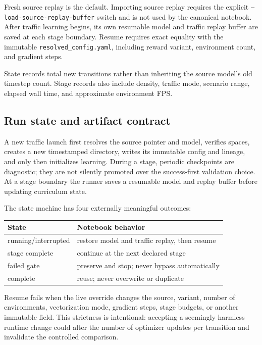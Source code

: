\documentclass[10pt,twocolumn]{article}
\begin{document}
Fresh source replay is the default. Importing source replay requires the explicit
\texttt{--load-source-replay-buffer} switch and is not used by the canonical notebook.
After traffic learning begins, its own resumable model and traffic replay buffer are
saved at each stage boundary. Resume requires exact equality with the immutable
\texttt{resolved\_config.yaml}, including reward variant, environment count, and gradient
steps.

State records total new transitions rather than inheriting the source model's old
timestep count. Stage records also include density, traffic mode, scenario range, elapsed
wall time, and approximate environment FPS.

\subsection{Run state and artifact contract}
A new traffic launch first resolves the source pointer and model, verifies spaces, creates
a new timestamped directory, writes its immutable config and lineage, and only then
initializes learning. During a stage, periodic checkpoints are diagnostic; they are not
silently promoted over the success-first validation choice. At a stage boundary the
runner saves a resumable model and replay buffer before updating curriculum state.

The state machine has four externally meaningful outcomes:
\begin{center}\scriptsize
\setlength{\tabcolsep}{3pt}
\begin{tabular}{lp{}}
\toprule
State & Notebook behavior \\
\midrule
running/interrupted & restore model and traffic replay, then resume \\
stage complete & continue at the next declared stage \\
failed gate & preserve and stop; never bypass automatically \\
complete & reuse; never overwrite or duplicate \\
\bottomrule
\end{tabular}
\end{center}
Resume fails when the live override changes the source, variant, number of environments,
vectorization mode, gradient steps, stage budgets, or another immutable field. This
strictness is intentional: accepting a seemingly harmless runtime change could alter the
number of optimizer updates per transition and invalidate the controlled comparison.
\end{document}
